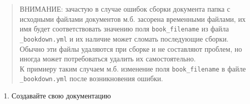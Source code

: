 \documentclass[12pt,a4paper,12pt,oneside,openany]{book}
\providecommand{\tightlist}{%
  \setlength{\itemsep}{0pt}\setlength{\parskip}{0pt}}
\begin{document}
\begin{quote}
ВНИМАНИЕ: зачастую в случае ошибок сборки документа папка с исходными файлами документов м.б. засорена временными файлами, их имя будет соответствовать значению поля \texttt{book\_filename} из файла \texttt{\_bookdown.yml} и их наличие может сломать последующие сборки.\\
Обычно эти файлы удаляются при сборке и не составляют проблем, но иногда может потребоваться удалить их самостоятельно.\\
К примиеру таким случаем м.б. изменение поля \texttt{book\_filename} в файле \texttt{\_bookdown.yml} после возникновения ошибки.
\end{quote}

\begin{enumerate}
\def\labelenumi{\arabic{enumi}.}
\setcounter{enumi}{1}
\tightlist
\item
  Создавайте свою документацию
\end{enumerate}
\end{document}
